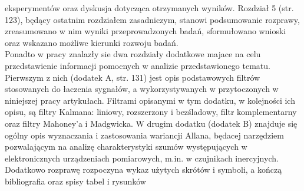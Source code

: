 \documentclass[10pt,a4paper]{report}
\begin{document}
\begin{FlushLeft}
eksperymentów oraz dyskusja dotycząca otrzymanych wyników. Rozdział 5 (str. 123), będący ostatnim rozdziałem zasadniczym, stanowi podsumowanie rozprawy, zreasumowano w nim wyniki przeprowadzonych badań, sformułowano wnioski oraz wskazano możliwe kierunki rozwoju badań. \\
Ponadto w pracy znalazły sie dwa rozdziały dodatkowe  majace na celu przedstawienie informacji pomocnych w analizie przedstawionego tematu. Pierwszym z nich (dodatek A, str. 131) jest opis podstawowych filtrów stosowanych do łaczenia sygnałów, a wykorzystywanych w przytoczonych w niniejszej pracy artykułach. Filtrami opisanymi w tym dodatku, w kolejności ich opisu, są filtry Kalmana: liniowy, rozszerzony i bezśladowy, filtr komplementarny oraz filtry Mahoney’a i Madgwicka. W drugim dodatku (dodatek B) znajduje się ogólny opis wyznaczania i zastosowania wariancji Allana, będacej narzędziem pozwalającym na analizę charakterystyki szumów występujących w elektronicznych urządzeniach pomiarowych, m.in. w czujnikach inercyjnych.\\

Dodatkowo rozprawę rozpoczyna wykaz użytych skrótów i symboli, a kończą bibliografia oraz spisy tabel i rysunków


	\end{FlushLeft}
\end{document}
